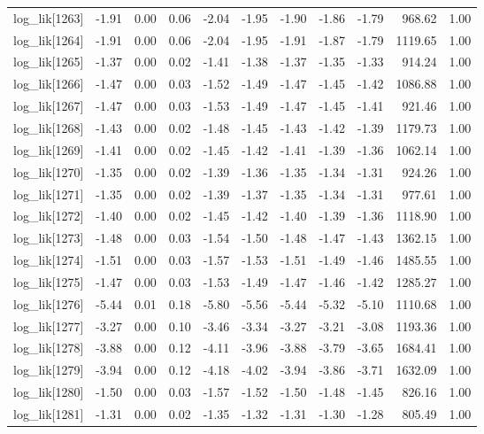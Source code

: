 \begin{table}[ht]
\begin{tabular}{rrrrrrrrrrr}
  log\_lik[1263] & -1.91 & 0.00 & 0.06 & -2.04 & -1.95 & -1.90 & -1.86 & -1.79 & 968.62 & 1.00 \\ 
  log\_lik[1264] & -1.91 & 0.00 & 0.06 & -2.04 & -1.95 & -1.91 & -1.87 & -1.79 & 1119.65 & 1.00 \\ 
  log\_lik[1265] & -1.37 & 0.00 & 0.02 & -1.41 & -1.38 & -1.37 & -1.35 & -1.33 & 914.24 & 1.00 \\ 
  log\_lik[1266] & -1.47 & 0.00 & 0.03 & -1.52 & -1.49 & -1.47 & -1.45 & -1.42 & 1086.88 & 1.00 \\ 
  log\_lik[1267] & -1.47 & 0.00 & 0.03 & -1.53 & -1.49 & -1.47 & -1.45 & -1.41 & 921.46 & 1.00 \\ 
  log\_lik[1268] & -1.43 & 0.00 & 0.02 & -1.48 & -1.45 & -1.43 & -1.42 & -1.39 & 1179.73 & 1.00 \\ 
  log\_lik[1269] & -1.41 & 0.00 & 0.02 & -1.45 & -1.42 & -1.41 & -1.39 & -1.36 & 1062.14 & 1.00 \\ 
  log\_lik[1270] & -1.35 & 0.00 & 0.02 & -1.39 & -1.36 & -1.35 & -1.34 & -1.31 & 924.26 & 1.00 \\ 
  log\_lik[1271] & -1.35 & 0.00 & 0.02 & -1.39 & -1.37 & -1.35 & -1.34 & -1.31 & 977.61 & 1.00 \\ 
  log\_lik[1272] & -1.40 & 0.00 & 0.02 & -1.45 & -1.42 & -1.40 & -1.39 & -1.36 & 1118.90 & 1.00 \\ 
  log\_lik[1273] & -1.48 & 0.00 & 0.03 & -1.54 & -1.50 & -1.48 & -1.47 & -1.43 & 1362.15 & 1.00 \\ 
  log\_lik[1274] & -1.51 & 0.00 & 0.03 & -1.57 & -1.53 & -1.51 & -1.49 & -1.46 & 1485.55 & 1.00 \\ 
  log\_lik[1275] & -1.47 & 0.00 & 0.03 & -1.53 & -1.49 & -1.47 & -1.46 & -1.42 & 1285.27 & 1.00 \\ 
  log\_lik[1276] & -5.44 & 0.01 & 0.18 & -5.80 & -5.56 & -5.44 & -5.32 & -5.10 & 1110.68 & 1.00 \\ 
  log\_lik[1277] & -3.27 & 0.00 & 0.10 & -3.46 & -3.34 & -3.27 & -3.21 & -3.08 & 1193.36 & 1.00 \\ 
  log\_lik[1278] & -3.88 & 0.00 & 0.12 & -4.11 & -3.96 & -3.88 & -3.79 & -3.65 & 1684.41 & 1.00 \\ 
  log\_lik[1279] & -3.94 & 0.00 & 0.12 & -4.18 & -4.02 & -3.94 & -3.86 & -3.71 & 1632.09 & 1.00 \\ 
  log\_lik[1280] & -1.50 & 0.00 & 0.03 & -1.57 & -1.52 & -1.50 & -1.48 & -1.45 & 826.16 & 1.00 \\ 
  log\_lik[1281] & -1.31 & 0.00 & 0.02 & -1.35 & -1.32 & -1.31 & -1.30 & -1.28 & 805.49 & 1.00 \\ 

\end{tabular}
\end{table}

